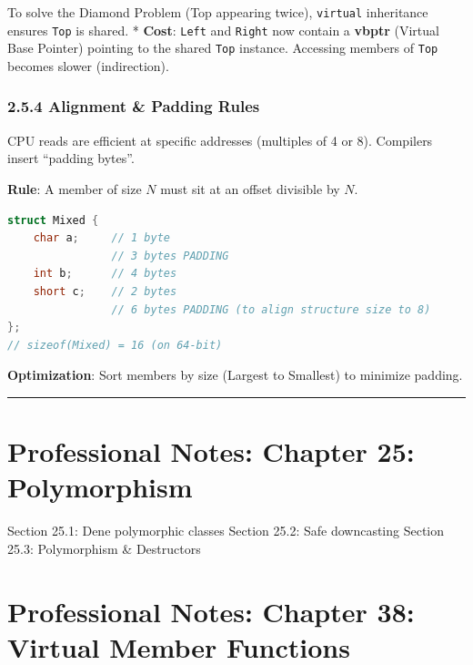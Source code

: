 To solve the Diamond Problem (Top appearing twice),
\passthrough{\lstinline!virtual!} inheritance ensures
\passthrough{\lstinline!Top!} is shared. * \textbf{Cost}:
\passthrough{\lstinline!Left!} and \passthrough{\lstinline!Right!} now
contain a \textbf{vbptr} (Virtual Base Pointer) pointing to the shared
\passthrough{\lstinline!Top!} instance. Accessing members of
\passthrough{\lstinline!Top!} becomes slower (indirection).

\hypertarget{alignment-padding-rules}{%
\subsubsection{2.5.4 Alignment \& Padding
Rules}\label{alignment-padding-rules}}

CPU reads are efficient at specific addresses (multiples of 4 or 8).
Compilers insert ``padding bytes''.

\textbf{Rule}: A member of size \(N\) must sit at an offset divisible by
\(N\).

\begin{lstlisting}[language={C++}]
struct Mixed {
    char a;     // 1 byte
                // 3 bytes PADDING
    int b;      // 4 bytes
    short c;    // 2 bytes
                // 6 bytes PADDING (to align structure size to 8)
};
// sizeof(Mixed) = 16 (on 64-bit)
\end{lstlisting}

\textbf{Optimization}: Sort members by size (Largest to Smallest) to
minimize padding.

\begin{center}\rule{0.5\linewidth}{0.5pt}\end{center}

\hypertarget{professional-notes-chapter-25-polymorphism}{%
\section{Professional Notes: Chapter 25:
Polymorphism}\label{professional-notes-chapter-25-polymorphism}}

Section 25.1: Dene polymorphic classes Section 25.2: Safe downcasting
Section 25.3: Polymorphism \& Destructors

\hypertarget{professional-notes-chapter-38-virtual-member-functions}{%
\section{Professional Notes: Chapter 38: Virtual Member
Functions}\label{professional-notes-chapter-38-virtual-member-functions}}

